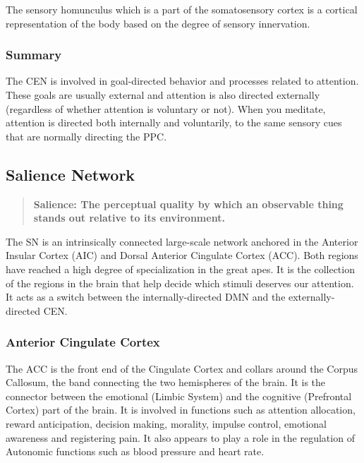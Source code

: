 \documentclass[a4paper, amsfonts, amssymb, amsmath, reprint, showkeys, nofootinbib, twoside]{revtex4-1}
\begin{document}
The sensory homunculus which is a part of the somatosensory cortex is a cortical representation
of the body based on the degree of sensory innervation. \cite{sensoryhom}



\subsubsection{Summary}

The CEN is involved in goal-directed behavior and processes
related to attention. These goals are usually external and attention is also directed
externally (regardless of whether attention is voluntary or not). When you meditate,
attention is directed both internally and voluntarily, to the same sensory cues that
are normally directing the PPC.

\subsection{Salience Network}

\begin{quote}
  \textbf{Salience: The perceptual quality by which an observable thing stands out
    relative to its environment.}
\end{quote}

The SN is an intrinsically connected large-scale network anchored in the Anterior
Insular Cortex (AIC) and Dorsal Anterior Cingulate Cortex (ACC). Both regions have reached a
high degree of specialization in the great apes. It is the collection of the regions
in the brain that help decide which stimuli deserves our attention. It acts as a
switch between the internally-directed DMN and the externally-directed CEN. \cite{saliencenetwork}

\subsubsection{Anterior Cingulate Cortex}

The ACC is the front end of the Cingulate Cortex and collars around the Corpus
Callosum, the band connecting the two hemispheres of the brain. It is the connector
between the emotional (Limbic System) and the cognitive (Prefrontal Cortex) part of
the brain. It is involved in functions such as attention allocation, reward
anticipation, decision making, morality, impulse control, emotional awareness and
registering pain. \cite{accstroop,accreward,snmorality,empathypain,acccognitive} It
also appears to play a role in the regulation of Autonomic functions such as blood
pressure and heart rate. \cite{accbloodpressure}
\end{document}
